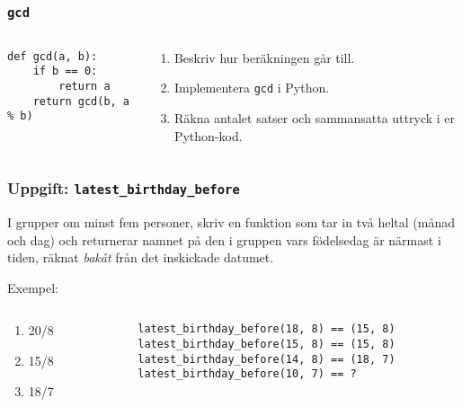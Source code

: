 \documentclass{beamer}
\begin{document}
  \begin{frame}[fragile]
    \frametitle{\texttt{gcd}}

    \begin{columns}
      \begin{column}{0.48\textwidth}
        \begin{verbatim}
def gcd(a, b):
    if b == 0:
        return a
    return gcd(b, a % b)
        \end{verbatim}
      \end{column}%
      \begin{column}{0.48\textwidth}
        \begin{enumerate}
          \item Beskriv hur beräkningen går till.
          \item Implementera \texttt{gcd} i Python.
          \item Räkna antalet satser och sammansatta uttryck i er Python-kod.
        \end{enumerate}
      \end{column}%
    \end{columns}
  \end{frame}

  \begin{frame}
    \frametitle{Uppgift: \texttt{latest\_birthday\_before}}

    I grupper om minst fem personer, skriv en funktion som tar in två heltal
    (månad och dag) och returnerar namnet på den i gruppen vars födelsedag är
    närmast i tiden, räknat \emph{bakåt} från det inskickade datumet.

    \pause
    \vspace{1em}

    Exempel:

    \begin{columns}[T]
      \begin{column}{0.2\textwidth}
        \begin{enumerate}
          \item 20/8
          \item 15/8
          \item 18/7
        \end{enumerate}
      \end{column}%
      \begin{column}{0.78\textwidth}
        \texttt{latest\_birthday\_before(18, 8) == (15, 8)}\\
        \texttt{latest\_birthday\_before(15, 8) == (15, 8)}\\
        \texttt{latest\_birthday\_before(14, 8) == (18, 7)}\\
        \texttt{latest\_birthday\_before(10, 7) == ?}
      \end{column}%
    \end{columns}
  \end{frame}
\end{document}
